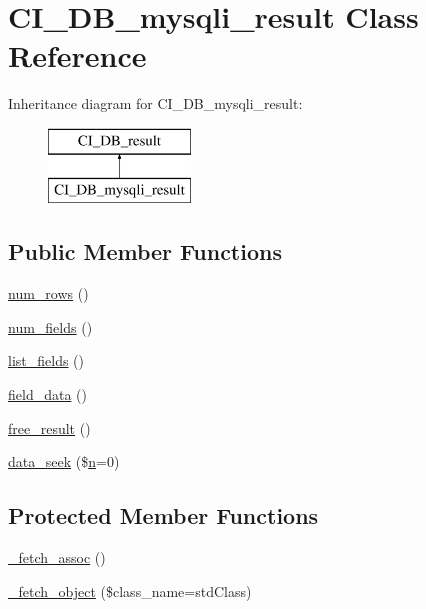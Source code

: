 \hypertarget{class_c_i___d_b__mysqli__result}{}\section{C\+I\+\_\+\+D\+B\+\_\+mysqli\+\_\+result Class Reference}
\label{class_c_i___d_b__mysqli__result}
Inheritance diagram for C\+I\+\_\+\+D\+B\+\_\+mysqli\+\_\+result\+:\begin{figure}[H]
\begin{center}
\leavevmode
\includegraphics[height=2.000000cm]{class_c_i___d_b__mysqli__result}
\end{center}
\end{figure}
\subsection*{Public Member Functions}
\begin{DoxyCompactItemize}
\item 
\mbox{\hyperlink{class_c_i___d_b__mysqli__result_a218657c303ee499b97710ab0cd2f5d6e}{num\+\_\+rows}} ()
\item 
\mbox{\hyperlink{class_c_i___d_b__mysqli__result_af831bf363e4d7d661a717a4932af449d}{num\+\_\+fields}} ()
\item 
\mbox{\hyperlink{class_c_i___d_b__mysqli__result_a50b54eb4ea7cfd039740f532988ea776}{list\+\_\+fields}} ()
\item 
\mbox{\hyperlink{class_c_i___d_b__mysqli__result_a84bffd65e53902ade1591716749a33e3}{field\+\_\+data}} ()
\item 
\mbox{\hyperlink{class_c_i___d_b__mysqli__result_aad2d98d6beb3d6095405356c6107b473}{free\+\_\+result}} ()
\item 
\mbox{\hyperlink{class_c_i___d_b__mysqli__result_a8255ae91816e4206e29eb7581c5af0f1}{data\+\_\+seek}} (\$\mbox{\hyperlink{cli_2error__php_8php_a2e6b16bbc42094e4c51ade3c10afdcf1}{n}}=0)
\end{DoxyCompactItemize}
\subsection*{Protected Member Functions}
\begin{DoxyCompactItemize}
\item 
\mbox{\hyperlink{class_c_i___d_b__mysqli__result_a43a9a92817f1334a1c10752ec44275a0}{\+\_\+fetch\+\_\+assoc}} ()
\item 
\mbox{\hyperlink{class_c_i___d_b__mysqli__result_a60806be6a9c2488820813c2a7f4fef71}{\+\_\+fetch\+\_\+object}} (\$class\+\_\+name=\textquotesingle{}std\+Class\textquotesingle{})
\end{DoxyCompactItemize}
